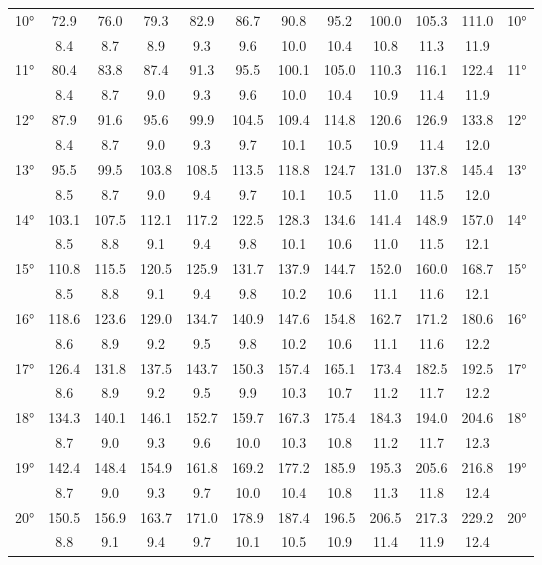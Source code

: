 \begin{footnotesize}
\begin{tabular}{c || c | c | c | c | c | c | c | c | c | c || c}
		\multirow{2}{*}{10°}&72.9&76.0&79.3&82.9&86.7&90.8&95.2&100.0&105.3&111.0&\multirow{2}{*}{10°}\\ \space&8.4&8.7&8.9&9.3&9.6&10.0&10.4&10.8&11.3&11.9&\space\\\hline
		\multirow{2}{*}{11°}&80.4&83.8&87.4&91.3&95.5&100.1&105.0&110.3&116.1&122.4&\multirow{2}{*}{11°}\\ \space&8.4&8.7&9.0&9.3&9.6&10.0&10.4&10.9&11.4&11.9&\space\\\hline
		\multirow{2}{*}{12°}&87.9&91.6&95.6&99.9&104.5&109.4&114.8&120.6&126.9&133.8&\multirow{2}{*}{12°}\\ \space&8.4&8.7&9.0&9.3&9.7&10.1&10.5&10.9&11.4&12.0&\space\\\hline
		\multirow{2}{*}{13°}&95.5&99.5&103.8&108.5&113.5&118.8&124.7&131.0&137.8&145.4&\multirow{2}{*}{13°}\\ \space&8.5&8.7&9.0&9.4&9.7&10.1&10.5&11.0&11.5&12.0&\space\\\hline
		\multirow{2}{*}{14°}&103.1&107.5&112.1&117.2&122.5&128.3&134.6&141.4&148.9&157.0&\multirow{2}{*}{14°}\\ \space&8.5&8.8&9.1&9.4&9.8&10.1&10.6&11.0&11.5&12.1&\space\\\hline
		\multirow{2}{*}{15°}&110.8&115.5&120.5&125.9&131.7&137.9&144.7&152.0&160.0&168.7&\multirow{2}{*}{15°}\\ \space&8.5&8.8&9.1&9.4&9.8&10.2&10.6&11.1&11.6&12.1&\space\\\hline
		\multirow{2}{*}{16°}&118.6&123.6&129.0&134.7&140.9&147.6&154.8&162.7&171.2&180.6&\multirow{2}{*}{16°}\\ \space&8.6&8.9&9.2&9.5&9.8&10.2&10.6&11.1&11.6&12.2&\space\\\hline
		\multirow{2}{*}{17°}&126.4&131.8&137.5&143.7&150.3&157.4&165.1&173.4&182.5&192.5&\multirow{2}{*}{17°}\\ \space&8.6&8.9&9.2&9.5&9.9&10.3&10.7&11.2&11.7&12.2&\space\\\hline
		\multirow{2}{*}{18°}&134.3&140.1&146.1&152.7&159.7&167.3&175.4&184.3&194.0&204.6&\multirow{2}{*}{18°}\\ \space&8.7&9.0&9.3&9.6&10.0&10.3&10.8&11.2&11.7&12.3&\space\\\hline
		\multirow{2}{*}{19°}&142.4&148.4&154.9&161.8&169.2&177.2&185.9&195.3&205.6&216.8&\multirow{2}{*}{19°}\\ \space&8.7&9.0&9.3&9.7&10.0&10.4&10.8&11.3&11.8&12.4&\space\\\hline
		\multirow{2}{*}{20°}&150.5&156.9&163.7&171.0&178.9&187.4&196.5&206.5&217.3&229.2&\multirow{2}{*}{20°}\\ \space&8.8&9.1&9.4&9.7&10.1&10.5&10.9&11.4&11.9&12.4&\space\\\hline

\end{tabular}
\end{footnotesize}
